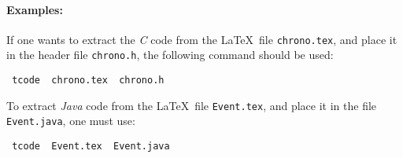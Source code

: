 \iffalse
 Les deux noms de fichiers (avec l'extension) doivent \^etre diff\'erents.
Par exemple, si le fichier destin\'e \`a \LaTeX\  est {\tt chrono.tex} et
que l'on veut en extraire le code compilable et placer ce dernier dans
{\tt chrono.h} (module de d\'efinition), on utilisera la commande:
\fi

\paragraph{Examples:}
If one wants
to extract the   {\it C} code  from the \LaTeX\ file {\tt chrono.tex},
 and place it in
the header file {\tt chrono.h}, the following
 command should be used:

\begin {center}\tt
  tcode \ chrono.tex \ chrono.h
\end {center}

To extract {\it Java} code  from the \LaTeX\  file {\tt Event.tex},
and place it in the file {\tt Event.java}, one must use:

\begin {center}\tt
  tcode \ Event.tex \ Event.java
\end {center}
%
%
%